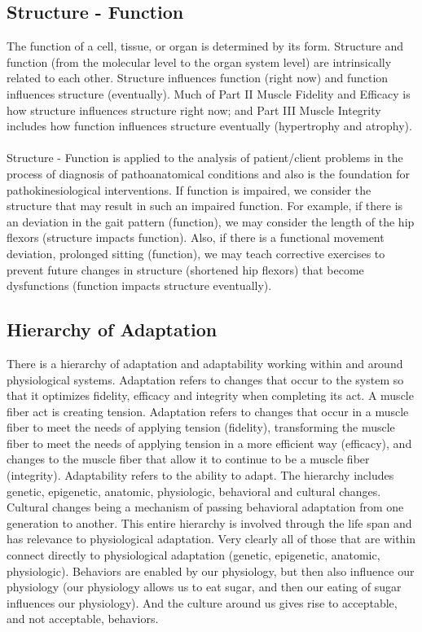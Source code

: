 \subsection{Structure - Function}
The function of a cell, tissue, or organ is determined by its form. Structure and function (from the molecular level to the organ system level) are intrinsically related to each other. Structure influences function (right now) and function influences structure (eventually). Much of Part II Muscle Fidelity and Efficacy is how structure influences structure right now; and Part III Muscle Integrity includes how function influences structure eventually (hypertrophy and atrophy).

\paragraph{}
Structure - Function is applied to the analysis of patient/client problems in the process of diagnosis of pathoanatomical conditions and also is the foundation for pathokinesiological interventions. If function is impaired, we consider the structure that may result in such an impaired function. For example, if there is an deviation in the gait pattern (function), we may consider the length of the hip flexors (structure impacts function). Also, if there is a functional movement deviation, prolonged sitting (function), we may teach corrective exercises to prevent future changes in structure (shortened hip flexors) that become dysfunctions (function impacts structure eventually).

\subsection{Hierarchy of Adaptation}

There is a hierarchy of adaptation and adaptability working within and around physiological systems. Adaptation refers to changes that occur to the system so that it optimizes fidelity, efficacy and integrity when completing its act. A muscle fiber act is creating tension. Adaptation refers to changes that occur in a muscle fiber to meet the needs of applying tension (fidelity), transforming the muscle fiber to meet the needs of applying tension in a more efficient way (efficacy), and changes to the muscle fiber that allow it to continue to be a muscle fiber (integrity). Adaptability refers to the ability to adapt. The hierarchy includes genetic, epigenetic, anatomic, physiologic, behavioral and cultural changes. Cultural changes being a mechanism of passing behavioral adaptation from one generation to another. This entire hierarchy is involved through the life span and has relevance to physiological adaptation. Very clearly all of those that are within connect directly to physiological adaptation (genetic, epigenetic, anatomic, physiologic). Behaviors are enabled by our physiology, but then also influence our physiology (our physiology allows us to eat sugar, and then our eating of sugar influences our physiology). And the culture around us gives rise to acceptable, and not acceptable, behaviors. 

